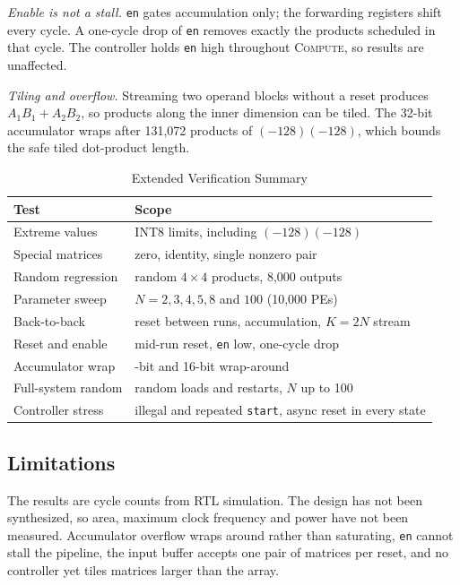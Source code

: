 \documentclass[conference]{IEEEtran}
\begin{document}
\emph{Enable is not a stall.} \texttt{en} gates accumulation only; the forwarding registers
shift every cycle. A one-cycle drop of \texttt{en} removes exactly the products scheduled in
that cycle. The controller holds \texttt{en} high throughout \textsc{Compute}, so results are
unaffected.

\emph{Tiling and overflow.} Streaming two operand blocks without a reset produces
$A_1B_1+A_2B_2$, so products along the inner dimension can be tiled. The 32-bit accumulator
wraps after 131,072 products of $(-128)(-128)$, which bounds the safe tiled dot-product
length.

\begin{table}[t]
\centering
\caption{Extended Verification Summary}
\label{tab:ext}
\setlength{\tabcolsep}{4pt}
\begin{tabular}{@{}>{\raggedright\arraybackslash}p{1.15in}>{\raggedright\arraybackslash}p{1.95in}@{}}
\toprule
Test & Scope\\
\midrule
Extreme values & INT8 limits, including $(-128)(-128)$\\
Special matrices & zero, identity, single nonzero pair\\
Random regression & 500 random $4\times4$ products, 8,000 outputs\\
Parameter sweep & $N=2,3,4,5,8$ and $100$ (10,000 PEs)\\
Back-to-back & reset between runs, accumulation, $K=2N$ stream\\
Reset and enable & mid-run reset, \texttt{en} low, one-cycle drop\\
Accumulator wrap & 32-bit and 16-bit wrap-around\\
Full-system random & random loads and restarts, $N$ up to 100\\
Controller stress & illegal and repeated \texttt{start}, async reset in every state\\
\bottomrule
\end{tabular}
\end{table}

\subsection{Limitations}
The results are cycle counts from RTL simulation. The design has not been synthesized, so
area, maximum clock frequency and power have not been measured. Accumulator overflow wraps
around rather than saturating, \texttt{en} cannot stall the pipeline, the input buffer accepts
one pair of matrices per reset, and no controller yet tiles matrices larger than the array.
\end{document}
